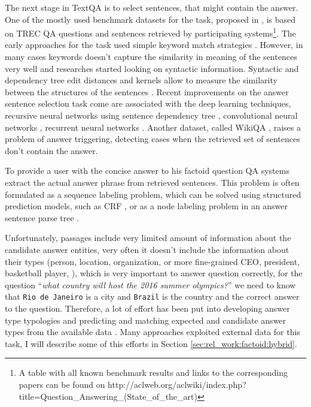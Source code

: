 The next stage in TextQA is to select sentences, that might contain the answer.
One of the mostly used benchmark datasets for the task, proposed in \cite{wang2007jeopardy}, is based on TREC QA questions and sentences retrieved by participating systems\footnote{A table with all known benchmark results and links to the corresponding papers can be found on http://aclweb.org/aclwiki/index.php?title=Question\_Answering\_(State\_of\_the\_art)}.
The early approaches for the task used simple keyword match strategies \cite{ittycheriah2001ibm,soubbotin2001patterns}.
However, in many cases keywords doesn't capture the similarity in meaning of the sentences very well and researches started looking on syntactic information.
Syntactic and dependency tree edit distances and kernels allow to measure the similarity between the structures of the sentences \cite{punyakanok2004mapping,shen2005exploring,heilman2010tree,yao2013answer,wang2010probabilistic}.
Recent improvements on the answer sentence selection task come are associated with the deep learning techniques, \eg recursive neural networks using sentence dependency tree \cite{iyyer2014neural}, convolutional neural networks \cite{yu2014deep,santos2016attentive}, recurrent neural networks \cite{tan2015lstm,WangN15}.
Another dataset, called WikiQA \cite{yang2015wikiqa}, raises a problem of answer triggering, \ie detecting cases when the retrieved set of sentences don't contain the answer.

To provide a user with the concise answer to his factoid question QA systems extract the actual answer phrase from retrieved sentences.
This problem is often formulated as a sequence labeling problem, which can be solved using structured prediction models, such as CRF \cite{yao2013answer}, or as a node labeling problem in an answer sentence parse tree \cite{malon2013answer}.

Unfortunately, passages include very limited amount of information about the candidate answer entities, \ie very often it doesn't include the information about their types (person, location, organization, or more fine-grained CEO, president, basketball player, \etc), which is very important to answer question correctly, \eg for the question ``\textit{what country will host the 2016 summer olympics?}'' we need to know that \texttt{Rio de Janeiro} is a city and \texttt{Brazil} is the country and the correct answer to the question.
Therefore, a lot of effort has been put into developing answer type typologies \cite{hovy2000question,Hovy:2002:QTS:1289189.1289206} and predicting and matching expected and candidate answer types from the available data \cite{LiRoth02,li2006learning, prager2006question}.
Many approaches exploited external data for this task, I will describe some of this efforts in Section \ref{sec:rel_work:factoid:hybrid}.

